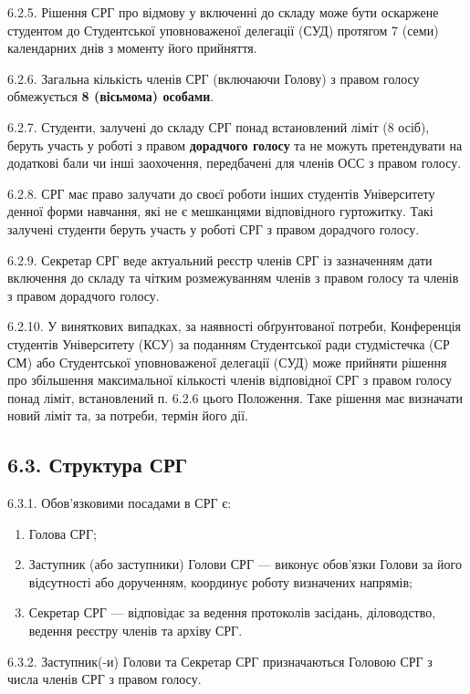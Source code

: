     6.2.5. Рішення СРГ про відмову у включенні до складу може бути оскаржене студентом до Студентської уповноваженої делегації (СУД) протягом 7 (семи) календарних днів з моменту його прийняття.

    6.2.6. Загальна кількість членів СРГ (включаючи Голову) з правом голосу обмежується \textbf{8 (вісьмома) особами}.

    6.2.7. Студенти, залучені до складу СРГ понад встановлений ліміт (8 осіб), беруть участь у роботі з правом \textbf{дорадчого голосу} та не можуть претендувати на додаткові бали чи інші заохочення, передбачені для членів ОСС з правом голосу.

    6.2.8. СРГ має право залучати до своєї роботи інших студентів Університету денної форми навчання, які не є мешканцями відповідного гуртожитку. Такі залучені студенти беруть участь у роботі СРГ з правом дорадчого голосу.

    6.2.9. Секретар СРГ веде актуальний реєстр членів СРГ із зазначенням дати включення до складу та чітким розмежуванням членів з правом голосу та членів з правом дорадчого голосу.

    6.2.10. У виняткових випадках, за наявності обґрунтованої потреби, Конференція студентів Університету (КСУ) за поданням Студентської ради студмістечка (СР СМ) або Студентської уповноваженої делегації (СУД) може прийняти рішення про збільшення максимальної кількості членів відповідної СРГ з правом голосу понад ліміт, встановлений п. 6.2.6 цього Положення. Таке рішення має визначати новий ліміт та, за потреби, термін його дії.

\subsection*{6.3. Структура СРГ}
    6.3.1. Обов'язковими посадами в СРГ є:

        \begin{enumerate}[label=\alph*)]
            \item Голова СРГ;
            \item Заступник (або заступники) Голови СРГ — виконує обов'язки Голови за його відсутності або дорученням, координує роботу визначених напрямів;
            \item Секретар СРГ — відповідає за ведення протоколів засідань, діловодство, ведення реєстру членів та архіву СРГ.
        \end{enumerate}

    6.3.2. Заступник(-и) Голови та Секретар СРГ призначаються Головою СРГ з числа членів СРГ з правом голосу.

